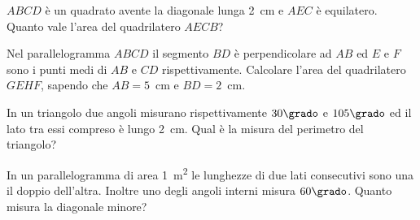 \begin{multicols}{2}
\begin{esercizio}
\label{ese:7.104}
\(ABCD\) è un quadrato avente la diagonale lunga 2~cm e \(AEC\) è 
equilatero. Quanto vale l'area del quadrilatero \(AECB\)?
\end{esercizio}

%
%


\begin{esercizio}
\label{ese:7.109}
Nel parallelogramma \(ABCD\) il segmento \(BD\) è perpendicolare ad \(AB\) 
ed \(E\) e \(F\) sono i punti medi di \(AB\) e \(CD\) rispettivamente. 
Calcolare l'area del quadrilatero \(GEHF\), sapendo che \(AB=5\)~cm e 
\(BD=2\)~cm.
\end{esercizio}

%

\begin{esercizio}
\label{ese:7.110}
In un triangolo due angoli misurano rispettivamente \(30\grado\) e 
\(105\grado\) ed il lato tra essi compreso è lungo 2~cm. Qual è la 
misura del perimetro del triangolo? 
\end{esercizio}

\begin{esercizio}
\label{ese:7.111}
In un parallelogramma di area 1~m\textsuperscript{2} le lunghezze di 
due lati consecutivi sono una il doppio dell'altra. Inoltre uno degli 
angoli interni misura \(60\grado\). Quanto misura la diagonale minore?
\end{esercizio}


\end{multicols}
